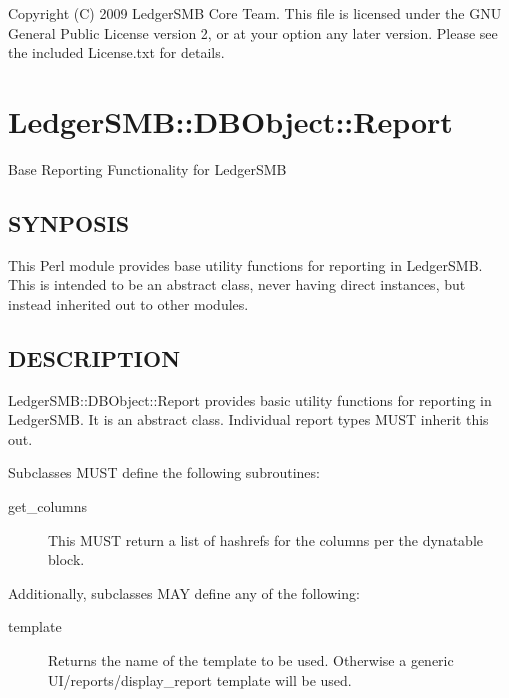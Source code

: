 \begin{description}
\begin{description}
\begin{description}
\begin{description}
\begin{description}
Copyright (C) 2009 LedgerSMB Core Team.  This file is licensed under the GNU 
General Public License version 2, or at your option any later version.  Please
see the included License.txt for details.

\section{LedgerSMB::DBObject::Report\label{LedgerSMB::DBObject::Report}}


Base Reporting Functionality for LedgerSMB

\subsection*{SYNPOSIS\label{LedgerSMB::DBObject::Report_SYNPOSIS}}


This Perl module provides base utility functions for reporting in LedgerSMB.
This is intended to be an abstract class, never having direct instances, but
instead inherited out to other modules.

\subsection*{DESCRIPTION\label{LedgerSMB::DBObject::Report_DESCRIPTION}}


LedgerSMB::DBObject::Report provides basic utility functions for reporting in
LedgerSMB.  It is an abstract class.  Individual report types MUST inherit this
out.



Subclasses MUST define the following subroutines:

\begin{description}

\item[{get\_columns}] \mbox{}

This MUST return a list of hashrefs for the columns per the dynatable block.

\end{description}


Additionally, subclasses MAY define any of the following:

\begin{description}

\item[{template}] \mbox{}

Returns the name of the template to be used.  Otherwise a generic
UI/reports/display\_report template will be used.


\end{description}
\end{description}
\end{description}
\end{description}
\end{description}
\end{description}
